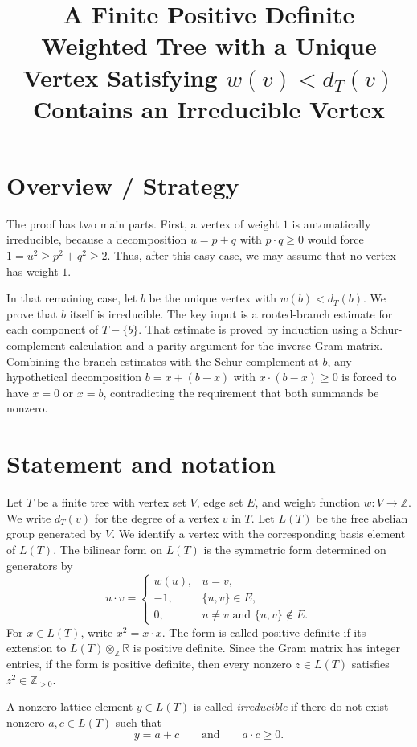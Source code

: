 \documentclass[12pt]{article}
\title{A Finite Positive Definite Weighted Tree with a Unique Vertex Satisfying \(w(v)<d_T(v)\) Contains an Irreducible Vertex}
\author{}
\date{}
\newcommand{\Z}{\mathbb{Z}}
\begin{document}
\maketitle

\section*{Overview / Strategy}

The proof has two main parts. First, a vertex of weight \(1\) is automatically irreducible, because a decomposition \(u=p+q\) with \(p\cdot q\ge 0\) would force \(1=u^2\ge p^2+q^2\ge 2\). Thus, after this easy case, we may assume that no vertex has weight \(1\).

In that remaining case, let \(b\) be the unique vertex with \(w(b)<d_T(b)\). We prove that \(b\) itself is irreducible. The key input is a rooted-branch estimate for each component of \(T-\{b\}\). That estimate is proved by induction using a Schur-complement calculation and a parity argument for the inverse Gram matrix. Combining the branch estimates with the Schur complement at \(b\), any hypothetical decomposition \(b=x+(b-x)\) with \(x\cdot(b-x)\ge0\) is forced to have \(x=0\) or \(x=b\), contradicting the requirement that both summands be nonzero.

\section*{Statement and notation}

Let \(T\) be a finite tree with vertex set \(V\), edge set \(E\), and weight function \(w:V\to\Z\). We write \(d_T(v)\) for the degree of a vertex \(v\) in \(T\). Let \(L(T)\) be the free abelian group generated by \(V\). We identify a vertex with the corresponding basis element of \(L(T)\). The bilinear form on \(L(T)\) is the symmetric form determined on generators by
\[
u\cdot v=
\begin{cases}
w(u), & u=v,\\
-1, & \{u,v\}\in E,\\
0, & u\ne v \text{ and } \{u,v\}\notin E.
\end{cases}
\]
For \(x\in L(T)\), write \(x^2=x\cdot x\). The form is called positive definite if its extension to \(L(T)\otimes_{\Z}\mathbb R\) is positive definite. Since the Gram matrix has integer entries, if the form is positive definite, then every nonzero \(z\in L(T)\) satisfies \(z^2\in\Z_{>0}\).

A nonzero lattice element \(y\in L(T)\) is called \emph{irreducible} if there do not exist nonzero \(a,c\in L(T)\) such that
\[
y=a+c
\qquad\text{and}\qquad
a\cdot c\ge 0.
\]
\end{document}
